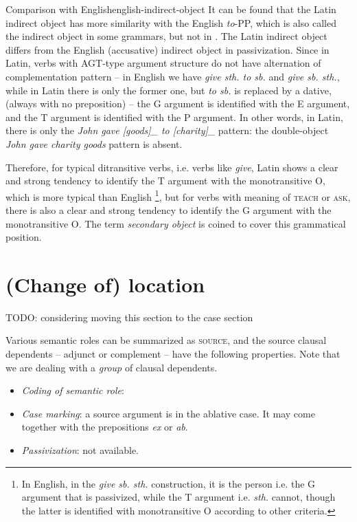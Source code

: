 \documentclass[a4paper, oneside, 12pt]{report}
\newcommand*{\term}[1]{\emph{#1}}
\newcommand{\form}[1]{\emph{#1}}
\newcommand*{\category}[1]{\textsc{#1}}
\begin{document}
\begin{infobox}{Comparison with English}{english-indirect-object}
    It can be found that the Latin indirect object has more similarity with the English \form{to}-PP,
    which is also called the indirect object in some grammars, but not in \citet{cgel}.
    The Latin indirect object differs from the English (accusative) indirect object in passivization.
    Since in Latin, verbs with AGT-type argument structure do not have alternation of complementation pattern
    -- in English we have \form{give sth. to sb.} and \form{give sb. sth.}, 
    while in Latin there is only the former one, but \form{to sb.} is replaced by a dative,
    (always with no preposition) --
    the G argument is identified with the E argument,
    and the T argument is identified with the P argument.
    In other words, in Latin, there is only 
    the \form{John gave [goods]_{} to [charity]_{}} pattern:
    the double-object \form{John gave charity goods} pattern is absent.
    
    Therefore, for typical ditransitive verbs, i.e. verbs like \form{give}, 
    Latin shows a clear and strong tendency to identify the T argument with the monotransitive O,
    which is more typical than English%
    \footnote{
        In English, in the \form{give sb. sth.} construction, it is the person i.e. the G argument that is passivized,
        while the T argument i.e. \form{sth.} cannot, though the latter is identified with monotransitive O
        according to other criteria. 
    },
    but for verbs with meaning of \category{teach} or \category{ask},
    there is also a clear and strong tendency to identify the G argument with the monotransitive O.
    The term \term{secondary object} is coined to cover this grammatical position.
\end{infobox}



\section{(Change of) location}

TODO: considering moving this section to the case section

Various semantic roles can be summarized as \category{source}, 
and the source clausal dependents -- adjunct or complement -- have the following properties.
Note that we are dealing with a \emph{group} of clausal dependents.
\begin{itemize}
    \item \emph{Coding of semantic role}: 
        
    \item \emph{Case marking}: a source argument is in the ablative case.
        It may come together with the prepositions \form{ex} or \form{ab}.
    \item \emph{Passivization}: not available.
\end{itemize}
\end{document}
